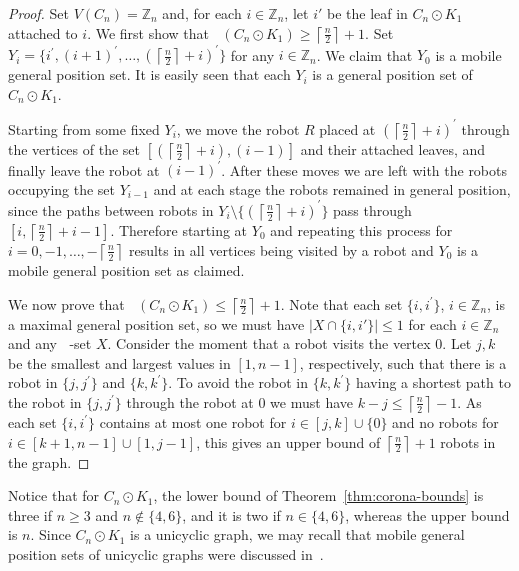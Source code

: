 \documentclass[a4paper,12pt]{article}
\DeclareMathOperator{\mob}{Mob_{gp}}
\theoremstyle{definition}
\begin{document}
	\begin{proof}
		Set $V(C_n) = \mathbb{Z}_n$ and, for each $i\in \mathbb{Z}_n$, let $i'$ be the leaf in $C_n\odot K_1$ attached to $i$. We first show that $\mob(C_n \odot K_1) \ge \left\lceil \frac{n}{2}\right\rceil + 1$. Set $Y_i = \{i^{\prime },(i+1)^{\prime },\dots,\left ( \left\lceil \frac{n}{2}\right\rceil +i\right )^{\prime }\}$ for any $i \in \mathbb{Z}_n$. We claim that $Y_0$ is a mobile general position set. It is easily seen that each $Y_i$ is a general position set of $C_n \odot K_1$. 
		
		Starting from some fixed $Y_i$, we move the robot $R$ placed at $\left ( \left\lceil \frac{n}{2}\right\rceil +i\right )^{\prime }$ through the vertices of the set $[ \left ( \left\lceil \frac{n}{2}\right\rceil +i\right ),(i-1)]$ and their attached leaves, and finally leave the robot at $(i-1)^{\prime }$. After these moves we are left with the robots occupying the set $Y_{i-1}$ and at each stage the robots remained in general position, since the paths between robots in $Y_i \setminus \{ \left (\left \lceil \frac{n}{2} \right \rceil +i \right )^{\prime }\}$ pass through $[i,\left \lceil \frac{n}{2}\right \rceil +i-1]$. Therefore starting at $Y_0$ and repeating this process for $i = 0,-1,\dots ,-\left \lceil \frac{n}{2} \right \rceil $ results in all vertices being visited by a robot and $Y_0$ is a mobile general position set as claimed.
		
		We now prove that $\mob(C_n \odot K_1) \le \left\lceil \frac{n}{2}\right\rceil + 1$. Note that each set $\{ i,i^{\prime }\} $, $i \in \mathbb{Z}_n$, is a maximal general position set, so we must have $|X\cap \{i,i'\}| \le 1$ for each $i\in \mathbb{Z}_n$ and any $\mob$-set $X$. Consider the moment that a robot visits the vertex $0$. Let $j,k$ be the smallest and largest values in $[1,n-1]$, respectively, such that there is a robot in $\{ j,j^{\prime }\}$ and $\{ k,k^{\prime }\}$. To avoid the robot in $\{ k,k^{\prime }\} $ having a shortest path to the robot in $\{ j,j^{\prime }\}$ through the robot at $0$ we must have $k-j \leq \left \lceil \frac{n}{2} \right \rceil -1$. As each set $\{ i,i^{\prime }\}$ contains at most one robot for $i \in [j,k] \cup \{ 0\}$ and no robots for $i \in [k+1,n-1] \cup [1,j-1]$, this gives an upper bound of $\left \lceil \frac{n}{2} \right \rceil +1$ robots in the graph.  
	\end{proof}
	
	Notice that for $C_n \odot K_1$, the lower bound of Theorem~\ref{thm:corona-bounds} is three if $n \geq 3$ and $n \notin \{ 4,6\} $, and it is two if $n \in \{ 4,6\}$, whereas the upper bound is $n$. Since $C_n \odot K_1$ is a unicyclic graph, we may recall that mobile general position sets of unicyclic graphs were discussed in~\cite{klavzar-2023}.
	
\end{document}
